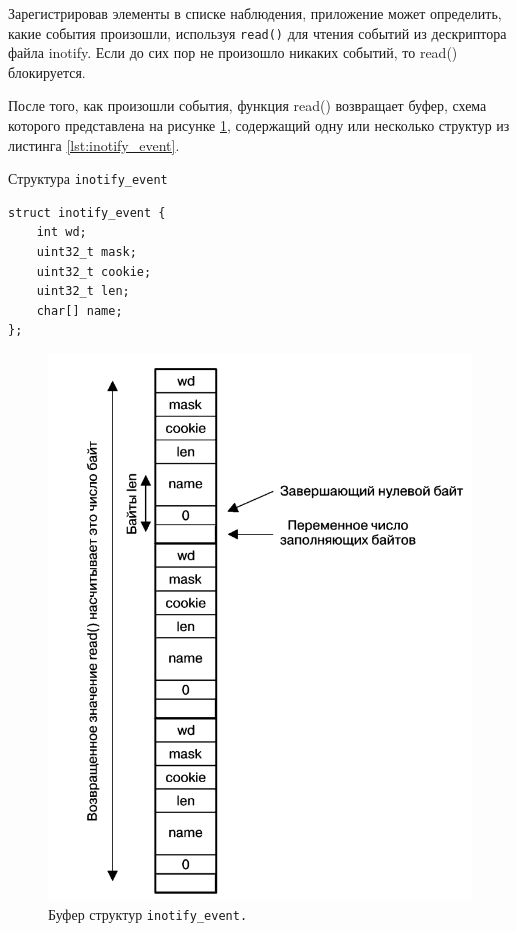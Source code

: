 \documentclass[14pt, russian]{scrartcl}
\newcommand{\code}[1]{\texttt{#1}}
\begin{document}
Зарегистрировав элементы в списке наблюдения, приложение может определить, какие
события произошли, используя \code{read()} для чтения событий из дескриптора
файла inotify. Если до сих пор не произошло никаких событий, то read()
блокируется.

После того, как произошли события, функция read() возвращает буфер, схема
которого представлена на рисунке \ref{fig:inotify_buffer}, содержащий одну или
несколько структур из листинга \ref{lst:inotify_event}.

\begin{listing}[H]
\caption{Структура \code{inotify\_event}}
\label{lst:inotify_event}
\begin{verbatim}
struct inotify_event {
    int wd;
    uint32_t mask;
    uint32_t cookie;
    uint32_t len;
    char[] name;
};
\end{verbatim}
\end{listing}

\begin{figure}[H]
  \centering
  \begin{minipage}[t]{.9\textwidth}
    \centering
    \includegraphics[width=.9\textwidth]{./imgs/inotify_buffer.png}
  \end{minipage}
  \caption{Буфер структур \code{inotify\_event.}}
  \label{fig:inotify_buffer}
\end{figure}
\end{document}
